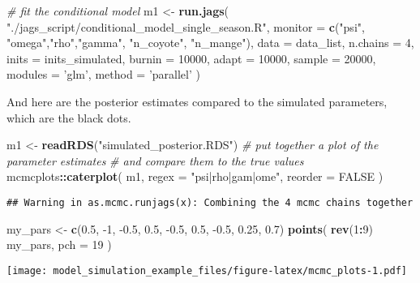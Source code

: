 \documentclass[
]{article}
\newenvironment{Shaded}{\begin{snugshade}}{\end{snugshade}}
\newcommand{\CommentTok}[1]{\textcolor[rgb]{0.56,0.35,0.01}{\textit{#1}}}
\newcommand{\DataTypeTok}[1]{\textcolor[rgb]{0.13,0.29,0.53}{#1}}
\newcommand{\DecValTok}[1]{\textcolor[rgb]{0.00,0.00,0.81}{#1}}
\newcommand{\FloatTok}[1]{\textcolor[rgb]{0.00,0.00,0.81}{#1}}
\newcommand{\KeywordTok}[1]{\textcolor[rgb]{0.13,0.29,0.53}{\textbf{#1}}}
\newcommand{\NormalTok}[1]{#1}
\newcommand{\OperatorTok}[1]{\textcolor[rgb]{0.81,0.36,0.00}{\textbf{#1}}}
\newcommand{\OtherTok}[1]{\textcolor[rgb]{0.56,0.35,0.01}{#1}}
\newcommand{\StringTok}[1]{\textcolor[rgb]{0.31,0.60,0.02}{#1}}
\begin{document}
\begin{Shaded}
\begin{Highlighting}[]
\CommentTok{# fit the conditional model}
\NormalTok{m1 <-}\StringTok{ }\KeywordTok{run.jags}\NormalTok{(}
  \StringTok{"./jags_script/conditional_model_single_season.R"}\NormalTok{,}
  \DataTypeTok{monitor =} \KeywordTok{c}\NormalTok{(}\StringTok{"psi"}\NormalTok{, }\StringTok{"omega"}\NormalTok{,}\StringTok{"rho"}\NormalTok{,}\StringTok{"gamma"}\NormalTok{, }\StringTok{"n_coyote"}\NormalTok{, }\StringTok{"n_mange"}\NormalTok{),}
  \DataTypeTok{data =}\NormalTok{ data_list,}
  \DataTypeTok{n.chains =} \DecValTok{4}\NormalTok{,}
  \DataTypeTok{inits =}\NormalTok{ inits_simulated,}
  \DataTypeTok{burnin =} \DecValTok{10000}\NormalTok{,}
  \DataTypeTok{adapt =} \DecValTok{10000}\NormalTok{,}
  \DataTypeTok{sample =} \DecValTok{20000}\NormalTok{,}
  \DataTypeTok{modules =} \StringTok{'glm'}\NormalTok{,}
  \DataTypeTok{method =} \StringTok{'parallel'}
\NormalTok{)}
\end{Highlighting}
\end{Shaded}

And here are the posterior estimates compared to the simulated
parameters, which are the black dots.

\begin{Shaded}
\begin{Highlighting}[]
\NormalTok{m1 <-}\StringTok{ }\KeywordTok{readRDS}\NormalTok{(}\StringTok{"simulated_posterior.RDS"}\NormalTok{)}
\CommentTok{# put together a plot of the parameter estimates}
\CommentTok{#  and compare them to the true values}
\NormalTok{mcmcplots}\OperatorTok{::}\KeywordTok{caterplot}\NormalTok{(}
\NormalTok{  m1,}
  \DataTypeTok{regex =} \StringTok{"psi|rho|gam|ome"}\NormalTok{,}
  \DataTypeTok{reorder =} \OtherTok{FALSE}
\NormalTok{)}
\end{Highlighting}
\end{Shaded}

\begin{verbatim}
## Warning in as.mcmc.runjags(x): Combining the 4 mcmc chains together
\end{verbatim}

\begin{Shaded}
\begin{Highlighting}[]
\NormalTok{my_pars <-}\StringTok{ }\KeywordTok{c}\NormalTok{(}\FloatTok{0.5}\NormalTok{, }\DecValTok{-1}\NormalTok{, }\FloatTok{-0.5}\NormalTok{, }\FloatTok{0.5}\NormalTok{, }\FloatTok{-0.5}\NormalTok{, }\FloatTok{0.5}\NormalTok{, }\FloatTok{-0.5}\NormalTok{, }\FloatTok{0.25}\NormalTok{, }\FloatTok{0.7}\NormalTok{)}
\KeywordTok{points}\NormalTok{(}
  \KeywordTok{rev}\NormalTok{(}\DecValTok{1}\OperatorTok{:}\DecValTok{9}\NormalTok{) }\OperatorTok{~}\StringTok{ }\NormalTok{my_pars,}
  \DataTypeTok{pch =} \DecValTok{19}
\NormalTok{)}
\end{Highlighting}
\end{Shaded}

\texttt{[image: model\_simulation\_example\_files/figure-latex/mcmc\_plots-1.pdf]}
\end{document}
